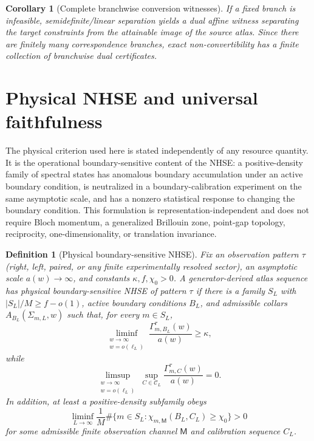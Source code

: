 \documentclass[11pt]{article}
\newtheorem{definition}{Definition}
\newtheorem{corollary}{Corollary}
\newcommand{\calC}{\mathcal C}
\begin{document}
\begin{corollary}[Complete branchwise conversion witnesses]
If a fixed branch is infeasible, semidefinite/linear separation yields a dual affine witness separating the target constraints from the attainable image of the source atlas. Since there are finitely many correspondence branches, exact non-convertibility has a finite collection of branchwise dual certificates.
\end{corollary}

\section{Physical NHSE and universal faithfulness}
\label{sec:physical}

The physical criterion used here is stated independently of any resource quantity. It is the
operational boundary-sensitive content of the NHSE: a positive-density family of spectral states
has anomalous boundary accumulation under an active boundary condition, is neutralized in a
boundary-calibration experiment on the same asymptotic scale, and has a nonzero statistical
response to changing the boundary condition. This formulation is representation-independent
and does not require Bloch momentum, a generalized Brillouin zone, point-gap topology,
reciprocity, one-dimensionality, or translation invariance.\cite{AnatomySkin,Universal2D,UnifiedLocalization,QuantumGeometry,NonAbelianSkin}

\begin{definition}[Physical boundary-sensitive NHSE]
Fix an observation pattern $\tau$ (right, left, paired, or any finite experimentally resolved
sector), an asymptotic scale $a(w)\to\infty$, and constants $\kappa,f,\chi_0>0$. A generator-derived
atlas sequence has physical boundary-sensitive NHSE of pattern $\tau$ if there is a family
$S_L$ with $|S_L|/M\ge f-o(1)$, active boundary conditions $B_L$, and admissible collars
$A_{B_L}(\Sigma_{m,L},w)$ such that, for every $m\in S_L$,
\[
\liminf_{\substack{w\to\infty\\w=o(\ell_L)}}
\frac{\Gamma_{m,B_L}^{\tau}(w)}{a(w)}\ge\kappa,
\]
while
\[
\limsup_{\substack{w\to\infty\\w=o(\ell_L)}}
\sup_{C\in\calC_L}
\frac{\Gamma_{m,C}^{\tau}(w)}{a(w)}=0.
\]
In addition, at least a positive-density subfamily obeys
\[
\liminf_{L\to\infty}\frac1M
\#\{m\in S_L:\chi_{m,\mathsf M}(B_L,C_L)\ge\chi_0\}>0
\]
for some admissible finite observation channel $\mathsf M$ and calibration sequence $C_L$.
\end{definition}
\end{document}
